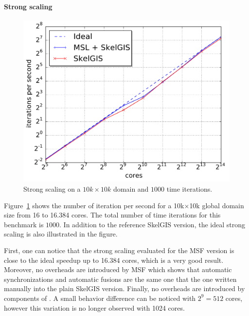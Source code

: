 \paragraph{\textbf{Strong scaling}}
\begin{figure}[t]\begin{center}
  \includegraphics[width=.6\textwidth]{../results/strong_scaling/10K_1K/median_strong.pdf}
  \caption{Strong scaling on a $10k \times 10k$ domain and $1000$ time iterations.}
  \label{fig:strong}
\end{center}\end{figure}

Figure~\ref{fig:strong} shows the number of iteration per second for a 10k$\times$10k global domain size from 16 to 16.384 cores. The total number of time iterations for this benchmark is $1000$. In addition to the reference SkelGIS version, the ideal strong scaling is also illustrated in the figure.

First, one can notice that the strong scaling evaluated for the MSF version is close to the ideal speedup up to 16.384 cores, which is a very good result. Moreover, no overheads are introduced by MSF which shows that automatic synchronizations and automatic fusions are the same one that the one written manually into the plain SkelGIS version. Finally, no overheads are introduced by components of \llc. A small behavior difference can be noticed with $2^9=512$ cores, however this variation is no longer observed with 1024 cores.

